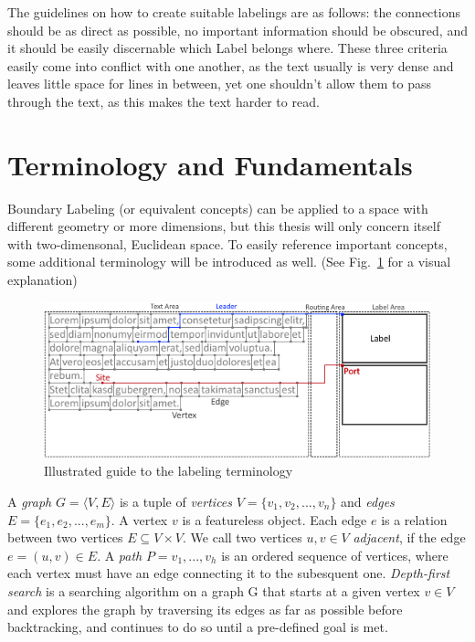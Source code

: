 \documentclass[11pt,a4paper]{vutinfth}
\begin{document}
The guidelines on how to create suitable labelings are as follows: the connections should be as direct as possible, no important information should be obscured, and it should be easily discernable which Label belongs where. These three criteria easily come into conflict with one another, as the text usually is very dense and leaves little space for lines in between, yet one shouldn't allow them to pass through the text, as this makes the text harder to read. 

\section{Terminology and Fundamentals} 
Boundary Labeling (or equivalent concepts) can be applied to a space with different geometry or more dimensions, but this thesis will only concern itself with two-dimensonal, Euclidean space.
To easily reference important concepts, some additional terminology will be introduced as well. (See Fig.~\ref{fig:term} for a visual explanation)


\begin{figure}
 \captionsetup{justification=centering, margin=0.75cm}
 \centering
  \includegraphics[scale=0.95]{GraphTerminologyExtended.png}
  \caption{Illustrated guide to the labeling terminology}
 \label{fig:term}
\end{figure}

A \emph{graph} $G=\langle V, E \rangle$ is a tuple of \emph{vertices} $V=\{v_1, v_2, ..., v_n\}$ and \emph{edges} $E=\{e_1, e_2, ..., e_m\}$. A vertex $v$ is a featureless object. %
 Each edge $e$ is a relation between two vertices $E \subseteq V\times V$. %
We call two vertices $u,v \in V$ \emph{adjacent}, if the edge $e=(u,v) \in E$.
 A \emph{path} $P=v_1, ..., v_h$ is an ordered sequence of vertices, where each vertex must have an edge connecting it to the subesquent one.
 \emph{Depth-first search} is a searching algorithm on a graph G that starts at a given vertex $v \in V$ and explores the graph by traversing its edges as far as possible before backtracking, and continues to do so until a pre-defined goal is met. 
\end{document}
